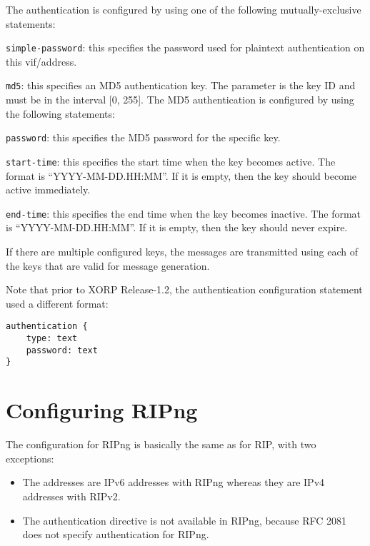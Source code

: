 \begin{description}
\begin{description}
The authentication is configured by using one of the following
mutually-exclusive statements:

\begin{description}
\item{\tt simple-password}: this specifies the password used for
  plaintext authentication on this vif/address.
\item{\tt md5}: this specifies an MD5 authentication key. The parameter
  is the key ID and must be in the interval [0, 255].
  The MD5 authentication is configured by using the following
  statements:
\begin{description}
  \item{\tt password}: this specifies the MD5 password for the specific
  key.
  \item{\tt start-time}: this specifies the start time when the key
  becomes active. The format is ``YYYY-MM-DD.HH:MM''. If it is empty,
  then the key should become active immediately.
  \item{\tt end-time}: this specifies the end time when the key becomes
  inactive. The format is ``YYYY-MM-DD.HH:MM''. If it is empty,
  then the key should never expire.
\end{description}

If there are multiple configured keys, the messages are transmitted
using each of the keys that are valid for message generation.

\end{description}

Note that prior to XORP Release-1.2, the authentication configuration
statement used a different format:
\begin{verbatim}
authentication {
    type: text
    password: text
}
\end{verbatim}

\end{description}
\end{description}

\section{Configuring RIPng}

The configuration for RIPng is basically the same as for RIP, with two
exceptions:
\begin{itemize}
\item The addresses are IPv6 addresses with RIPng whereas they are IPv4
  addresses with RIPv2.
\item The {\stt authentication} directive is not available in RIPng,
  because RFC 2081 does not specify authentication for RIPng.
\end{itemize}

